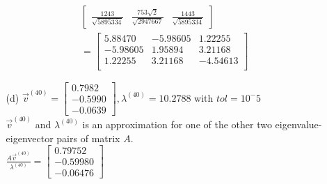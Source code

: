 \documentclass[12pt]{article}
\begin{document}
\begin{enumerate}[label=\bfseries Problem \arabic*:]
\begin{itemize}
\begin{align*}
            \begin{bmatrix}
                \frac{1243}{\sqrt{5895334}} & \frac{753\sqrt{2}}{\sqrt{2947667}} & \frac{1443}{\sqrt{5895334}}
            \end{bmatrix}\\
            =
            \begin{bmatrix}
                5.88470 & -5.98605 & 1.22255\\
                -5.98605 & 1.95894 & 3.21168\\
                1.22255 & 3.21168 & -4.54613\\
            \end{bmatrix}
        \end{align*}
        \item [(d)] $\vec{v}^{(40)}=\begin{bmatrix}
            0.7982\\
            -0.5990\\
            -0.0639
        \end{bmatrix},
        \lambda^{(40)}=10.2788$ with $tol=10^-5$\\
        $\vec{v}^{(40)}$ and $\lambda^{(40)}$ is an approximation for one of the other two eigenvalue-eigenvector pairs of matrix $A$.\\
        $\frac{A\vec{v}^{(40)}}{\lambda^{(40)}}=\begin{bmatrix}
            0.79752\\
            -0.59980\\
            -0.06476
        \end{bmatrix}$\\
            \begin{figure}[h!]
            \begin{subfigure}{.5\textwidth}
                \centering

\end{subfigure}
\end{figure}
\end{itemize}
\end{enumerate}
\end{document}

